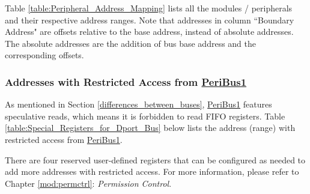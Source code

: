 \documentclass[main\_\_EN.tex]{subfiles}
\begin{document}
Table \ref{table:Peripheral_Address_Mapping} lists all the modules / peripherals and their respective address ranges. Note that addresses in column ``Boundary Address" are offsets relative to the base address, instead of absolute addresses. The absolute addresses are the addition of bus base address and the corresponding offsets.




\subsubsection{Addresses with Restricted Access from \hyperref[PeripheralBus1]{PeriBus1}} \label{special register inside peripherals}

As mentioned in Section \ref{differences_between_buses}, \hyperref[PeripheralBus1]{PeriBus1} features speculative reads, which means it is forbidden to read FIFO registers. Table \ref{table:Special_Registers_for_Dport_Bus} below lists the address (range) with restricted access from \hyperref[PeripheralBus1]{PeriBus1}.

There are four reserved user-defined registers that can be configured as needed to add more addresses with restricted access. For more information, please refer to Chapter \ref{mod:permctrl}: \textit{Permission Control}.


\end{document}
